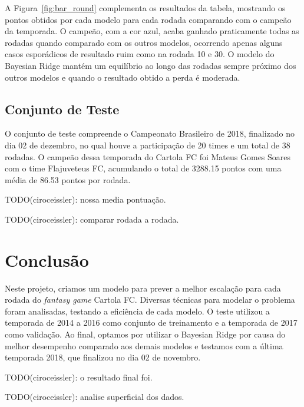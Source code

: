 \documentclass[conference]{IEEEtran}
\newcommand{\rfig}[1]{Figura~\ref{fig:#1}}
\newcommand{\tit}[1]{{\textit{#1}}}
\begin{document}
A \rfig{bar_round}  complementa os resultados da  tabela, mostrando os
pontos  obtidos por  cada modelo  para  cada rodada  comparando com  o
campeão  da temporada.  O campeão,  com  a cor  azul, acaba  ganhado
praticamente todas as rodadas quando  comparado com os outros modelos,
ocorrendo apenas alguns  casos esporádicos de resultado  ruim como na
rodada 10 e  30. O modelo do Bayesian Ridge  mantém um equilíbrio ao
longo  das rodadas  sempre  próximo  dos outros  modelos  e quando  o
resultado obtido a perda é moderada.

\subsection{Conjunto de Teste}

O  conjunto  de teste  compreende  o  Campeonato Brasileiro  de  2018,
finalizado no dia 02 de dezembro, no qual houve a participação de 20
times e um total de 38  rodadas. O campeão dessa temporada do Cartola
FC foi  Mateus Gomes Soares  com o  time Flajuveteus FC,  acumulando o
total de 3288.15 pontos com uma média de 86.53 pontos por rodada.

TODO(ciroceissler): nossa media pontuação.

TODO(ciroceissler): comparar rodada a rodada.

\section{Conclusão}

Neste projeto, criamos um modelo para prever a melhor escalação para
cada rodada do \tit{fantasy game}  Cartola FC. Diversas técnicas para
modelar o  problema foram analisadas,  testando a eficiência  de cada
modelo. O teste  utilizou a temporada de 2014 a  2016 como conjunto de
treinamento e a temporada de  2017 como validação. Ao final, optamos
por utilizar o Bayesian Ridge por causa do melhor desempenho comparado
aos  demais modelos  e  testamos  com a  última  temporada 2018,  que
finalizou no dia 02 de novembro.

TODO(ciroceissler): o resultado final foi.

TODO(ciroceissler): analise superficial dos dados.
\end{document}
